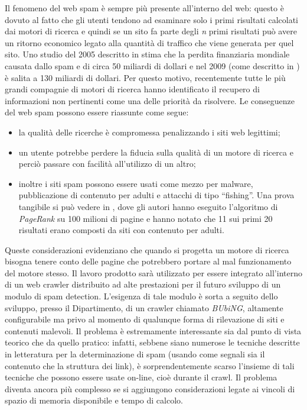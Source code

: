 Il fenomeno del web spam è sempre più presente all'interno del web: questo è dovuto al fatto che gli utenti tendono ad esaminare solo i primi risultati calcolati dai motori di ricerca e quindi se un sito fa parte degli \textit{n} primi risultati può avere un ritorno economico legato alla quantità di traffico che viene generata per quel sito. Uno studio  del 2005 descritto in \cite{Nicholas:2005} stima che la perdita finanziaria mondiale causata dallo spam e di circa 50 miliardi di dollari e nel 2009 (come descritto in \cite{Nicholas:2009}) è salita a 130 miliardi di dollari. Per questo motivo, recentemente tutte le più grandi compagnie di motori di ricerca hanno identificato il recupero di informazioni non pertinenti come una delle priorità da risolvere. Le conseguenze del web spam possono essere riassunte come segue\cite{Spirin:2012:SWS:2207243.2207252}:
\begin{itemize}
 \item la qualità delle ricerche è compromessa penalizzando i siti web legittimi;
 \item un utente potrebbe perdere la fiducia sulla qualità di un motore di ricerca e perciò passare con facilità all'utilizzo di un altro;
 \item inoltre i siti spam possono essere usati come mezzo per malware, pubblicazione di contenuto per adulti e attacchi di tipo ``fishing''. Una prova tangibile si può vedere in \cite{Eiron:2004:RWF:988672.988714}, dove gli autori hanno eseguito l'algoritmo di \textit{PageRank} su 100 milioni di pagine e hanno notato che 11 sui primi 20 risultati erano composti da siti con contenuto per adulti.
\end{itemize}
Queste considerazioni evidenziano che quando si progetta un motore di ricerca bisogna tenere conto delle pagine che potrebbero portare al mal funzionamento del motore stesso.
Il lavoro prodotto sarà utilizzato per essere integrato	all'interno di un web crawler distribuito ad alte prestazioni per il futuro sviluppo di un modulo di spam detection. L'esigenza di tale modulo è sorta a seguito dello sviluppo, presso il Dipartimento, di un crawler chiamato {\itshape BUbiNG}, altamente configurabile ma privo al momento di qualunque forma di rilevazione di siti e contenuti malevoli. Il problema è estremamente interessante sia dal punto di vista teorico che da quello pratico: infatti, sebbene siano numerose le tecniche descritte in letteratura per la determinazione di spam (usando come segnali sia il contenuto che la struttura dei link), è sorprendentemente scarso l'insieme di tali tecniche che possono essere usate on-line, cioè durante il crawl. Il problema diventa ancora più complesso se si aggiungono considerazioni legate ai vincoli di spazio di memoria disponibile e tempo di calcolo.
